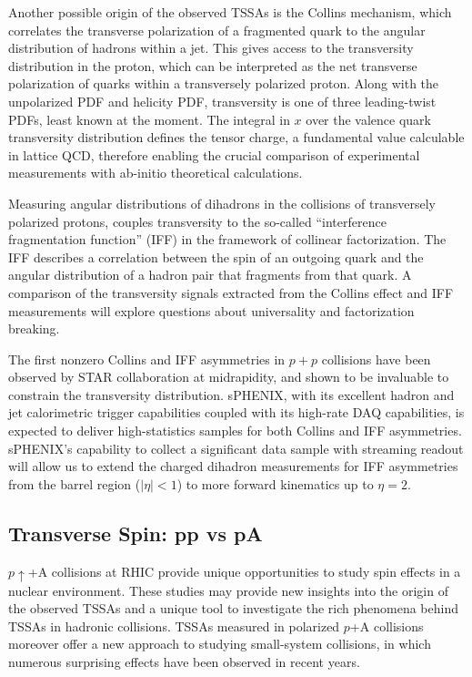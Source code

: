Another possible origin of the observed TSSAs is the Collins mechanism, which correlates the transverse polarization of a fragmented quark to the angular distribution of hadrons within a jet. This gives access to the transversity distribution in the proton, which can be interpreted as the net transverse polarization of quarks within a transversely polarized proton. Along with the unpolarized PDF and helicity PDF, transversity is one of three leading-twist PDFs, least known at the moment. The integral in $x$ over the valence quark transversity distribution defines the tensor charge, a fundamental value calculable in lattice QCD, therefore enabling the crucial comparison of experimental measurements with ab-initio theoretical calculations.

Measuring angular distributions of dihadrons in the collisions of transversely polarized protons, couples transversity to the so-called “interference fragmentation function” (IFF) in the framework of collinear factorization. The IFF describes a correlation between the spin of an outgoing quark and the angular distribution of a hadron pair that fragments from that quark.  A comparison of the transversity signals extracted from the Collins effect and IFF measurements will explore questions about universality and factorization breaking.

The first nonzero Collins and IFF asymmetries in $p+p$ collisions have been observed by STAR collaboration at midrapidity, and shown to be invaluable to constrain the transversity distribution. sPHENIX, with its excellent hadron and jet calorimetric trigger capabilities coupled with its high-rate DAQ capabilities, is expected to deliver high-statistics samples for both Collins and IFF asymmetries. sPHENIX's capability to collect a significant
data sample with streaming readout will allow us to extend the charged dihadron measurements for IFF asymmetries from the barrel region ($|\eta|<1$) to more forward kinematics up to $\eta=2$. 


\subsection {Transverse Spin: pp vs pA}

$p\uparrow$+A collisions at RHIC provide unique opportunities to study spin effects in a nuclear environment. These studies may provide new insights into the origin of the observed TSSAs and a unique tool to investigate the rich phenomena behind TSSAs in hadronic collisions. TSSAs measured in polarized $p$+A collisions moreover offer a new approach to studying small-system collisions, in which numerous surprising effects have been observed in recent years.

